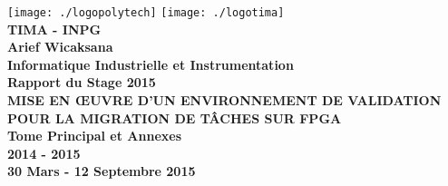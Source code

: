 \centering
\texttt{[image: ./logopolytech]}
\hfill
\texttt{[image: ./logotima]}\\
\raggedleft \textbf{\large TIMA - INPG}\hspace{1cm}
\\[4cm]
\centering
\DoubleSpacing
\textbf{\Large Arief Wicaksana} \\
\textbf{\Large Informatique Industrielle et Instrumentation} \\
\textbf{\Large Rapport du Stage 2015} \\[4 cm]
\textbf{\Large MISE EN ŒUVRE D'UN ENVIRONNEMENT DE VALIDATION POUR LA MIGRATION DE TÂCHES SUR FPGA} \\[4 cm]
\textbf{\Large Tome Principal et Annexes}\\
\vfill
\textbf{2014 - 2015}\\
\textbf{30 Mars - 12 Septembre 2015}